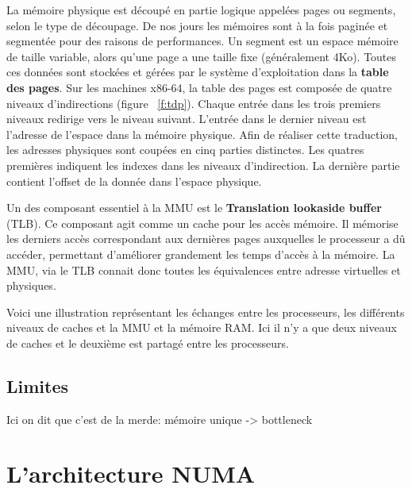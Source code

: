 
    La mémoire physique est découpé en partie logique appelées pages ou
    segments, selon le type de découpage. De nos jours les mémoires sont à la
    fois paginée et segmentée pour des raisons de performances. Un segment est
    un espace mémoire de taille variable, alors qu'une page a une taille fixe
    (généralement 4Ko). Toutes ces données sont stockées et gérées par le
    système d'exploitation dans la \textbf{table des pages}. Sur les machines
    x86-64, la table des pages est composée de quatre niveaux d'indirections
    (figure ~\ref{f:tdp}). Chaque entrée dans les trois premiers niveaux redirige
    vers le niveau suivant. L'entrée dans le dernier niveau est l'adresse de
    l'espace dans la mémoire physique. Afin de réaliser cette traduction, les
    adresses physiques sont coupées en cinq parties distinctes. Les quatres
    premières indiquent les indexes dans les niveaux d'indirection. La dernière
    partie contient l'offset de la donnée dans l'espace physique.
    

    Un des composant essentiel à la MMU est le \textbf{Translation lookaside
      buffer} (TLB). Ce composant agit comme un cache pour les accès mémoire. Il
    mémorise les derniers accès correspondant aux dernières pages auxquelles le
    processeur a dû accéder, permettant d'améliorer grandement les temps d'accès
    à la mémoire. La MMU, via le TLB connait donc toutes les équivalences entre
    adresse virtuelles et physiques.


    Voici une illustration représentant les échanges entre les processeurs, les
    différents niveaux de caches et la MMU et la mémoire RAM. Ici il n'y a que
    deux niveaux de caches et le deuxième est partagé entre les processeurs.
    


  \subsection{Limites}
  
    Ici on dit que c'est de la merde: mémoire unique -> bottleneck

  \section{L'architecture NUMA}

